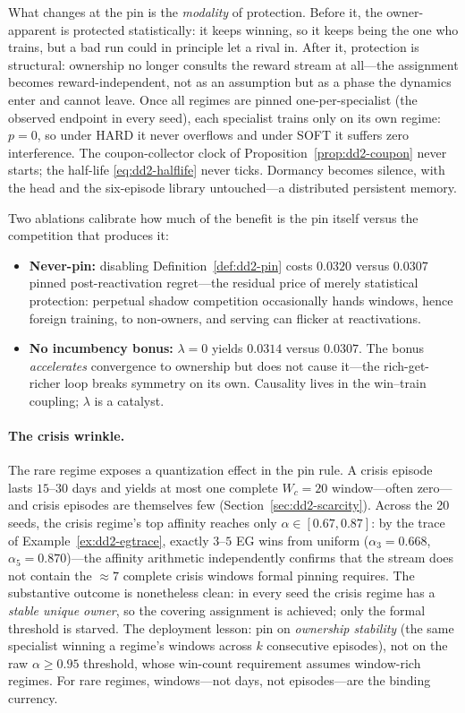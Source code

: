 \documentclass[11pt,a4paper]{article}
\theoremstyle{definition}
\theoremstyle{plain}
\begin{document}
What changes at the pin is the \emph{modality} of protection. Before it, the
owner-apparent is protected statistically: it keeps winning, so it keeps
being the one who trains, but a bad run could in principle let a rival in.
After it, protection is structural: ownership no longer consults the reward
stream at all---the assignment becomes reward-independent, not as an
assumption but as a phase the dynamics enter and cannot leave. Once all
regimes are pinned one-per-specialist (the observed endpoint in every seed),
each specialist trains only on its own regime: $p = 0$, so under HARD it
never overflows and under SOFT it suffers zero interference. The
coupon-collector clock of Proposition~\ref{prop:dd2-coupon} never starts; the
half-life \eqref{eq:dd2-halflife} never ticks. Dormancy becomes silence, with
the head and the six-episode library untouched---a distributed persistent
memory.

Two ablations calibrate how much of the benefit is the pin itself versus the
competition that produces it:
\begin{itemize}
  \item \textbf{Never-pin:} disabling Definition~\ref{def:dd2-pin} costs
        $0.0320$ versus $0.0307$ pinned post-reactivation regret---the
        residual price of merely statistical protection: perpetual shadow
        competition occasionally hands windows, hence foreign training, to
        non-owners, and serving can flicker at reactivations.
  \item \textbf{No incumbency bonus:} $\lambda = 0$ yields $0.0314$ versus
        $0.0307$. The bonus \emph{accelerates} convergence to ownership but
        does not cause it---the rich-get-richer loop breaks symmetry on its
        own. Causality lives in the win--train coupling; $\lambda$ is a
        catalyst.
\end{itemize}

\paragraph{The crisis wrinkle.}
The rare regime exposes a quantization effect in the pin rule. A crisis
episode lasts $15$--$30$ days and yields at most one complete $W_c = 20$
window---often zero---and crisis episodes are themselves few
(Section~\ref{sec:dd2-scarcity}). Across the 20 seeds, the crisis regime's
top affinity reaches only $\alpha \in [0.67, 0.87]$: by the trace of
Example~\ref{ex:dd2-egtrace}, exactly $3$--$5$ EG wins from uniform
($\alpha_3 = 0.668$, $\alpha_5 = 0.870$)---the affinity arithmetic
independently confirms that the stream does not contain the $\approx 7$
complete crisis windows formal pinning requires. The substantive outcome is
nonetheless clean: in every seed the crisis regime has a \emph{stable unique
owner}, so the covering assignment is achieved; only the formal threshold is
starved. The deployment lesson: pin on \emph{ownership stability} (the same
specialist winning a regime's windows across $k$ consecutive episodes), not
on the raw $\alpha \ge 0.95$ threshold, whose win-count requirement assumes
window-rich regimes. For rare regimes, windows---not days, not
episodes---are the binding currency.
\end{document}
